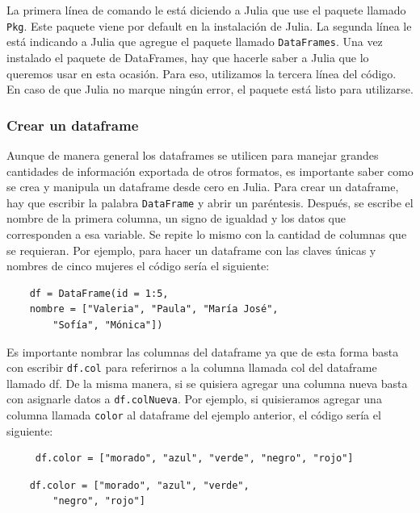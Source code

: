 La primera línea de comando le está diciendo a Julia que use el paquete llamado \texttt{Pkg}. Este paquete viene por default en la instalación de Julia. La segunda línea le está indicando a Julia que agregue el paquete llamado \texttt{DataFrames}. 
Una vez instalado el paquete de DataFrames, hay que hacerle saber a Julia que lo queremos usar en esta ocasión. Para eso, utilizamos la tercera línea del código. En caso de que Julia no marque ningún error, el paquete está listo para utilizarse. 

\subsubsection{Crear un dataframe}

Aunque de manera general los dataframes se utilicen para manejar grandes cantidades de información exportada de otros formatos, es importante saber como se crea y manipula un dataframe desde cero en Julia. Para crear un dataframe, hay que escribir la palabra \texttt{DataFrame} y abrir un paréntesis. Después, se escribe el nombre de la primera columna, un signo de igualdad y los datos que corresponden a esa variable. Se repite lo mismo con la cantidad de columnas que se requieran. Por ejemplo, para hacer un dataframe con las claves únicas y nombres de cinco mujeres el código sería el siguiente: 


\begin{tcolorbox}
    \begin{verbatim}
    df = DataFrame(id = 1:5, 
    nombre = ["Valeria", "Paula", "María José", 
        "Sofía", "Mónica"])
    \end{verbatim}
\end{tcolorbox}



Es importante nombrar las columnas del dataframe ya que de esta forma basta con escribir \texttt{df.col} para referirnos a la columna llamada col del dataframe llamado df. De la misma manera, si se quisiera agregar una columna nueva basta con asignarle datos a \texttt{df.colNueva}. Por ejemplo, si quisieramos agregar una columna llamada \texttt{color} al dataframe del ejemplo anterior, el código sería el siguiente: 

\begin{verbatim}
     df.color = ["morado", "azul", "verde", "negro", "rojo"]
\end{verbatim}

\begin{tcolorbox}
    \begin{verbatim}
    df.color = ["morado", "azul", "verde", 
        "negro", "rojo"]
    \end{verbatim}
\end{tcolorbox}


